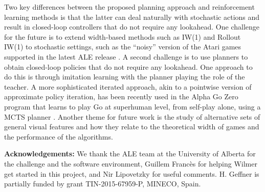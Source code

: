 \documentclass[letterpaper]{article}
\begin{document}
Two key differences between the proposed planning approach and reinforcement learning
methods is that the latter can deal naturally with stochastic actions and result in
closed-loop controllers that do not require any lookahead.
One challenge for the future is to extend width-based methods such as IW(1) and Rollout IW(1)
to stochastic settings, such as the ``noisy'' version of the Atari games supported in the
latest ALE release \cite{machado:ale}. A second challenge is to use planners to
obtain closed-loop policies that do not require any lookahead. One approach to do this
is through imitation learning with the planner playing the role of the teacher.
A more sophisticated iterated approach, akin to a pointwise version of approximate policy iteration,
has been recently used in the Alpha Go Zero program that learns to play Go at superhuman level,
from self-play alone, using a MCTS planner \cite{alpha-zero-go}.
Another theme for future work is the study of alternative sets of general visual
features and how they relate to the theoretical width of games and the performance
of the algorithms.


\medskip
\noindent\textbf{Acknowledgements:}
We thank the ALE team at the University of Alberta for the challenge and the software environment,
Guillem Franc\`es for helping Wilmer get started in this project, and
Nir Lipovetzky for useful comments.
H. Geffner is partially funded by grant TIN-2015-67959-P, MINECO, Spain.
\end{document}
